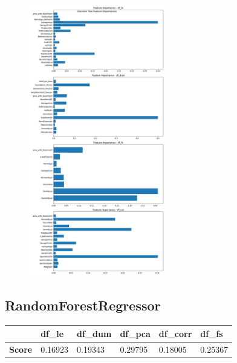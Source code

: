 \begin{figure}[H]
  \centering
  \includegraphics[width=0.53\textwidth]{./fig/featrees.png}
  \label{fig:corr1}
  \caption{}
\end{figure}








\subsection{RandomForestRegressor}
\begin{table}[H]
\begin{tabular}{l|l|l|l|l|l|}
\cline{2-6}
                                    & \textbf{df\_le} & \textbf{df\_dum} & \textbf{df\_pca} & \textbf{df\_corr} & \textbf{df\_fs} \\ \hline
\multicolumn{1}{|l|}{\textbf{Score}} & 0.16923         & 0.19343           & 0.29795          & 0.18005           & 0.25367         \\ \hline
\end{tabular}
\end{table}




